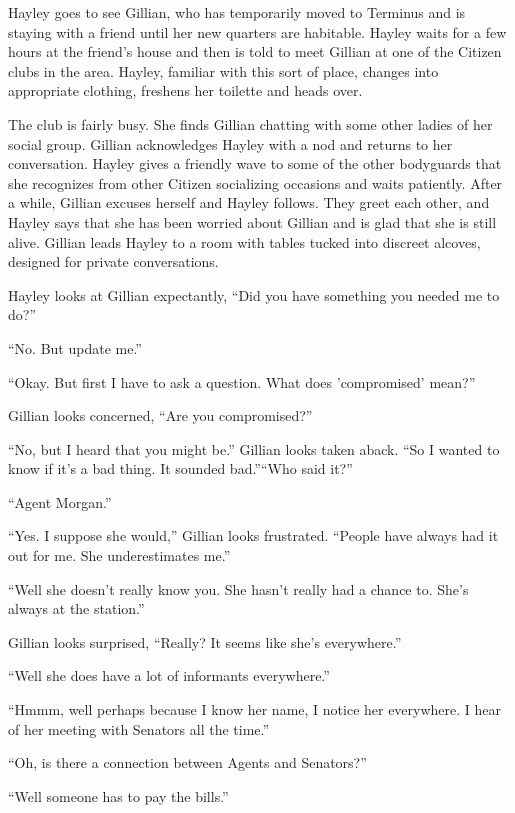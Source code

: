 Hayley goes to see Gillian, who has temporarily moved to Terminus and is staying with a friend until her new quarters are habitable.  Hayley waits for a few hours at the friend's house and then is told to meet Gillian at one of the Citizen clubs in the area.  Hayley, familiar with this sort of place, changes into appropriate clothing, freshens her toilette and heads over.  



The club is fairly busy.  She finds Gillian chatting with some other ladies of her social group.  Gillian acknowledges Hayley with a nod and returns to her conversation.  Hayley gives a friendly wave to some of the other bodyguards that she recognizes from other Citizen socializing occasions and waits patiently.  After a while, Gillian excuses herself and Hayley follows.  They greet each other, and Hayley says that she has been worried about Gillian and is glad that she is still alive.  Gillian leads Hayley to a room with tables tucked into discreet alcoves, designed for private conversations. 



Hayley looks at Gillian expectantly, ``Did you have something you needed me to do?''

``No.  But update me.''

``Okay.  But first I have to ask a question.  What does 'compromised' mean?''

Gillian looks concerned, ``Are you compromised?''

``No, but I heard that you might be.''  Gillian looks taken aback. ``So I wanted to know if it's a bad thing.  It sounded bad.''``Who said it?''

``Agent Morgan.''

``Yes.  I suppose she would,'' Gillian looks frustrated.  ``People have always had it out for me.  She underestimates me.''

``Well she doesn't really know you.  She hasn't really had a chance to.  She's always at the station.''

Gillian looks surprised, ``Really?  It seems like she's everywhere.''

``Well she does have a lot of informants everywhere.''

``Hmmm, well perhaps because I know her name, I notice her everywhere.  I hear of her meeting with Senators all the time.''

``Oh, is there a connection between Agents and Senators?''

``Well someone has to pay the bills.''


